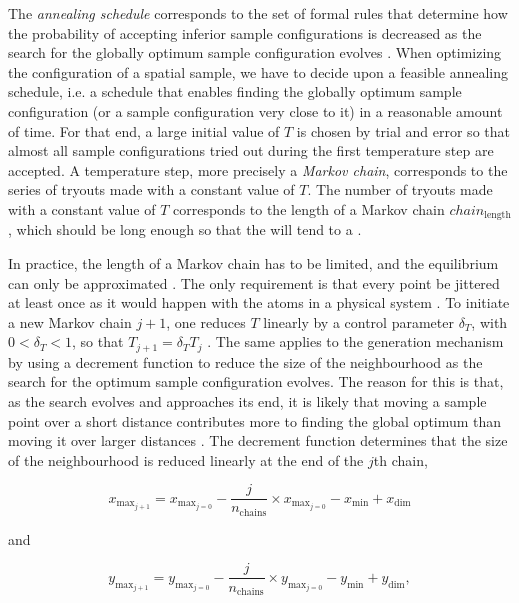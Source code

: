 The \emph{annealing schedule} corresponds to the set of formal rules that determine how the probability of 
accepting inferior sample configurations is decreased as the search for the globally optimum sample 
configuration evolves \cite{AartsEtAl1989, Groenigen1999a, WebsterEtAl2013}. When optimizing the configuration 
of a spatial sample, we have to decide upon a feasible annealing schedule, i.e. a schedule that enables finding 
the globally optimum sample configuration (or a sample configuration very close to it) in a reasonable amount 
of time. For that end, a large initial value of $T$ is chosen by trial and error so that almost all sample 
configurations tried out during the first temperature step are accepted. A temperature step, more precisely a 
\emph{Markov chain}, corresponds to the series of tryouts made with a constant value of $T$. The number of 
tryouts made with a constant value of $T$ corresponds to the length of a Markov chain $chain_\text{length}$, 
which should be long enough so that the  will tend to a .

In practice, the length of a Markov chain has to be limited, and the equilibrium can only be approximated 
\cite{WebsterEtAl2013}. The only requirement is that every point be jittered at least once as it would happen 
with the atoms in a physical system \cite{MetropolisEtAl1953}. To initiate a new Markov chain $j + 1$, one 
reduces $T$ linearly by a control parameter $\delta_{T}$, with $0 < \delta_{T} < 1$, so that $T_{j + 1} = 
\delta_{T}T_j$ \cite{AartsEtAl1989}. The same applies to the generation mechanism by using a decrement function 
to reduce the size of the neighbourhood as the search for the optimum sample configuration evolves. The reason 
for this is that, as the search evolves and approaches its end, it is likely that moving a sample point over a 
short distance contributes more to finding the global optimum than moving it over larger distances 
\cite{GroenigenEtAl1998}. The decrement function determines that the size of the neighbourhood is reduced 
linearly at the end of the $j$th chain,

\begin{equation} %
x_{\text{max}_{j + 1}} = x_{\text{max}_{j = 0}} - \frac{j}{n_\text{chains}} \times x_{\text{max}_{j = 0}} - 
                                           x_\text{min} + x_\text{dim}
\end{equation}

\noindent and 

\begin{equation} %
y_{\text{max}_{j + 1}} = y_{\text{max}_{j = 0}} - \frac{j}{n_\text{chains}} \times y_{\text{max}_{j = 0}} - 
                                           y_\text{min} + y_\text{dim},
\end{equation}

